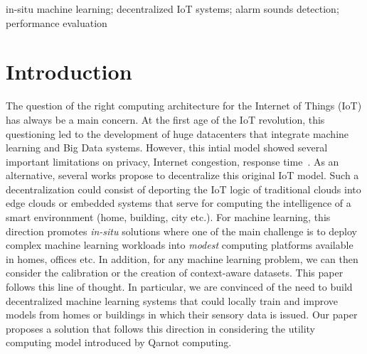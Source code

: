 \documentclass[10pt, conference, compsocconf]{IEEEtran}
\begin{document}
\begin{IEEEkeywords}
in-situ machine learning; decentralized IoT systems; alarm sounds detection;  performance evaluation

\end{IEEEkeywords}


%
\IEEEpeerreviewmaketitle


\section{Introduction} \label{Introduction}

The question of the right computing architecture for the Internet of Things (IoT) has always be a main concern. At the first age of the 
IoT revolution, this questioning led to the development of huge datacenters that integrate machine learning and Big Data systems. 
However, this intial model showed several important limitations on privacy, Internet congestion, 
response time~\cite{DBLP:conf/lcn/Roelands13}. As an alternative, several works propose to decentralize this original IoT model. 
Such a decentralization could consist of deporting the IoT logic of traditional clouds into edge clouds or embedded 
systems that serve for computing the intelligence of a smart environnment (home, building, city etc.). For machine learning, 
this direction promotes {\it in-situ} solutions where one of the main challenge is to deploy complex machine learning 
workloads into {\it modest} computing platforms available in homes, offices etc. In addition, for any machine learning problem, 
we can then consider the calibration or the creation of context-aware datasets. 
This paper follows this line of thought. In particular, we are convinced of the need to build decentralized machine learning 
systems that could locally train and improve models from homes or buildings in which their sensory data is issued. 
Our paper proposes a solution that follows this direction in considering the utility computing model introduced by 
Qarnot computing. 
\end{document}
